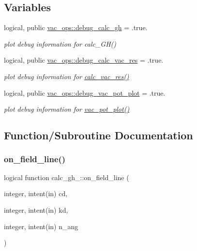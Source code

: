 \subsection*{Variables}
\begin{DoxyCompactItemize}
\item 
logical, public \hyperlink{namespacevac__ops_a9c1d2227ea0118cb9158f7e08f41affc}{vac\+\_\+ops\+::debug\+\_\+calc\+\_\+gh} = .true.
\begin{DoxyCompactList}\small\item\em plot debug information for calc\+\_\+\+G\+H() \end{DoxyCompactList}\item 
logical, public \hyperlink{namespacevac__ops_a6b99f921f077f63f641d5a9c86d88eaf}{vac\+\_\+ops\+::debug\+\_\+calc\+\_\+vac\+\_\+res} = .true.
\begin{DoxyCompactList}\small\item\em plot debug information for \hyperlink{namespacevac__ops_a5e5a8322b3aa2e3704b1050426f06d9d}{calc\+\_\+vac\+\_\+res()} \end{DoxyCompactList}\item 
logical, public \hyperlink{namespacevac__ops_a1afb20e30f5f99547fc8df4ace204ee9}{vac\+\_\+ops\+::debug\+\_\+vac\+\_\+pot\+\_\+plot} = .true.
\begin{DoxyCompactList}\small\item\em plot debug information for \hyperlink{namespacevac__ops_a3a2a3aed45951aecef42197b82a5a6da}{vac\+\_\+pot\+\_\+plot()} \end{DoxyCompactList}\end{DoxyCompactItemize}


\subsection{Function/\+Subroutine Documentation}
\mbox{\label{vac__ops_8f90_a3d8bbdba782171b063ad415370c8be48}} 
\subsubsection{\texorpdfstring{on\+\_\+field\+\_\+line()}{on\_field\_line()}}
{\footnotesize\ttfamily logical function calc\+\_\+gh\+\_\+::on\+\_\+field\+\_\+line (\begin{DoxyParamCaption}\item[{integer, intent(in)}]{cd,  }\item[{integer, intent(in)}]{kd,  }\item[{integer, intent(in)}]{n\+\_\+ang }\end{DoxyParamCaption})}



